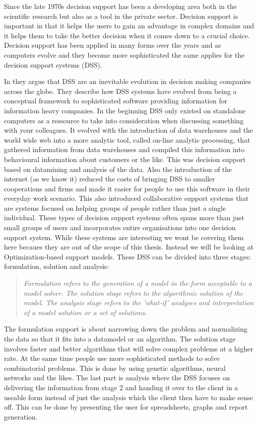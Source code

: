 Since the late 1970s decision support has been a developing area both in the scientific research but also as a tool in the private sector. Decision support is important in that it helps the users to gain an advantage in complex domains and it helps them to take the better decision when it comes down to a crucial choice. Decision support has been applied in many forms over the years and as computers evolve and they become more sophisticated the same applies for the decision support systems (DSS).

In \cite{shim2002past} they argue that DSS are an inevitable evolution in decision making companies across the globe. They describe how DSS systems have evolved from being a conceptual framework to sophisticated software providing information for information heavy companies. In the beginning DSS only existed on standalone computers as a ressource to take into consideration when discussing something with your colleagues. It evolved with the introduction of data warehouses and the world wide web into a more analytic tool, called on-line analytic processing, that gathered information from data warehouses and compiled this information into behavioural information about customers or the like. This was decision support based on datamining and analysis of the data. Also the introduction of the internet (as we know it) reduced the costs of bringing DSS to smaller cooperations and firms and made it easier for people to use this software in their everyday work scenario. This also introduced collaborative support systems that are systems focused on helping groups of people rather than just a single individual. These types of decision support systems often spans more than just small groups of users and incorporates entire organisations into one decision support system. While these systems are interesting we wont be covering them here becaues they are out of the scope of this thesis. Instead we will be looking at Optimization-based support models. These DSS can be divided into three stages: formulation, solution and analysis\cite{shim2002past}:
\begin{quotation}
\textit{Formulation refers to the generation of a model in the form acceptable to a model solver. The solution stage refers to the algorithmic solution of the model. The analysis stage refers to the 'what-if' analyses and interpretation of a model solution or a set of solutions.}
\end{quotation}
The formulation support is about narrowing down the problem and normalizing the data so that it fits into a datamodel or an algorithm. The solution stage involves faster and better algorithms that will solve complex problems at a higher rate. At the same time people use more sophisticated methods to solve combinatorial problems. This is done by using genetic algorithms, neural networks and the likes\cite{shim2002past}. The last part is analysis where the DSS focuses on delivering the information from stage 2 and handing it over to the client in a useable form instead of just the analysis which the client then have to make sense off. This can be done by presenting the user for spreadsheets, graphs and report generation.

